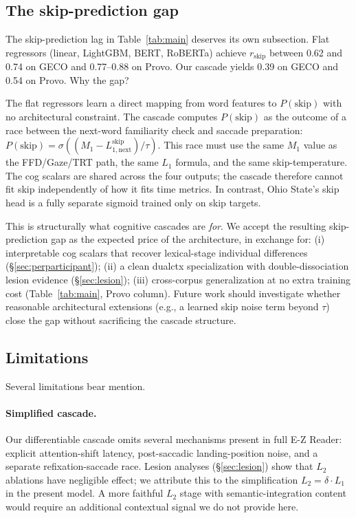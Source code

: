 \documentclass[11pt]{article}
\begin{document}
\subsection{The skip-prediction gap}\label{sec:skip-gap}

The skip-prediction lag in Table~\ref{tab:main} deserves its own subsection. Flat regressors (linear, LightGBM, BERT, RoBERTa) achieve $r_{\text{skip}}$ between 0.62 and 0.74 on GECO and 0.77--0.88 on Provo. Our cascade yields 0.39 on GECO and 0.54 on Provo. Why the gap?

The flat regressors learn a direct mapping from word features to $P(\text{skip})$ with no architectural constraint. The cascade computes $P(\text{skip})$ as the outcome of a race between the next-word familiarity check and saccade preparation: $P(\text{skip}) = \sigma\left((M_1 - L_{1,\text{next}}^{\text{skip}})/\tau\right)$. This race must use the same $M_1$ value as the FFD/Gaze/TRT path, the same $L_1$ formula, and the same skip-temperature. The cog scalars are shared across the four outputs; the cascade therefore cannot fit skip independently of how it fits time metrics. In contrast, Ohio State's skip head is a fully separate sigmoid trained only on skip targets.

This is structurally what cognitive cascades are \emph{for}. We accept the resulting skip-prediction gap as the expected price of the architecture, in exchange for: (i) interpretable cog scalars that recover lexical-stage individual differences (\S\ref{sec:perparticipant}); (ii) a clean dualctx specialization with double-dissociation lesion evidence (\S\ref{sec:lesion}); (iii) cross-corpus generalization at no extra training cost (Table~\ref{tab:main}, Provo column). Future work should investigate whether reasonable architectural extensions (e.g., a learned skip noise term beyond $\tau$) close the gap without sacrificing the cascade structure.

\subsection{Limitations}\label{sec:limitations}

Several limitations bear mention.

\paragraph{Simplified cascade.} Our differentiable cascade omits several mechanisms present in full E-Z Reader: explicit attention-shift latency, post-saccadic landing-position noise, and a separate refixation-saccade race. Lesion analyses (\S\ref{sec:lesion}) show that $L_2$ ablations have negligible effect; we attribute this to the simplification $L_2 = \delta \cdot L_1$ in the present model. A more faithful $L_2$ stage with semantic-integration content would require an additional contextual signal we do not provide here.
\end{document}
